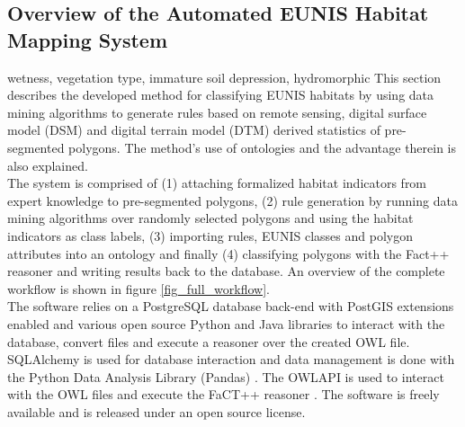 \documentclass[authoryear, review,12pt,number]{elsarticle}
\begin{document}
\subsection{Overview of the Automated EUNIS Habitat Mapping System}
wetness, vegetation type, immature soil depression, hydromorphic
This section describes the developed method for classifying EUNIS habitats by
using data mining algorithms to generate rules based on remote sensing, digital
surface model (DSM) and digital terrain model (DTM) derived statistics of
pre-segmented polygons. The method's use of ontologies and the advantage
therein is also explained.\\
The system is comprised of (1) attaching
formalized habitat indicators from expert knowledge to pre-segmented polygons,
(2) rule generation by running data mining algorithms over randomly selected
polygons and using the habitat indicators as class labels, (3) importing rules,
EUNIS classes and polygon attributes into an ontology and finally (4)
classifying polygons with the Fact++ reasoner \citep{Tsarkov2006} and writing
results back to the database. An overview of the complete workflow is shown in
figure \ref{fig_full_workflow}.\\
The software relies on a PostgreSQL database back-end with PostGIS extensions
enabled and various open source Python and Java libraries to interact with the
database, convert files and execute a reasoner over the created OWL file.
SQLAlchemy is used for database interaction and data management is done with
the Python Data Analysis Library (Pandas) \citep{McKinney2010}. The OWLAPI is
used to interact with the OWL files and execute the FaCT++ reasoner
\citep{Tsarkov2006}. The software is freely available and is released under an
open source license.  
\end{document}
